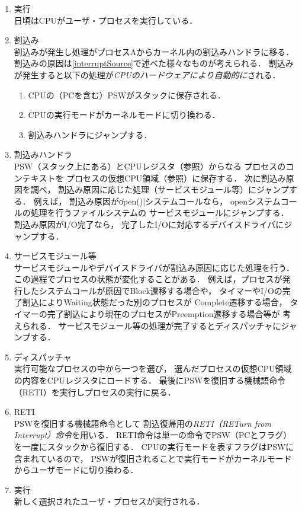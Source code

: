 \begin{enumerate}
\item 実行 \\
  日頃はCPUがユーザ・プロセスを実行している．
\item 割込み \\
  割込みが発生し処理がプロセスAからカーネル内の割込みハンドラに移る．
  割込みの原因は\ref{interruptSource}で述べた様々なものが考えられる．
  割込みが発生すると以下の処理が\emph{CPUのハードウェアにより自動的に}される．
  \begin{enumerate}
  \item CPUの（PCを含む）PSWがスタックに保存される．
  \item CPUの実行モードがカーネルモードに切り換わる．
  \item 割込みハンドラにジャンプする．
  \end{enumerate}
\item 割込みハンドラ \\
  PSW（スタック上にある）とCPUレジスタ（参照）からなる
  プロセスのコンテキストを
  プロセスの仮想CPU領域（参照）に保存する．
  次に割込み原因を調べ，
  割込み原因に応じた処理（サービスモジュール等）にジャンプする．
  例えば，
  割込み原因が\|open()|システムコールなら，
  openシステムコールの処理を行うファイルシステムの
  サービスモジュールにジャンプする．
  割込み原因がI/O完了なら，
  完了したI/Oに対応するデバイスドライバにジャンプする．
\item サービスモジュール等 \\
  サービスモジュールやデバイスドライバが割込み原因に応じた処理を行う．
  この過程でプロセスの状態が変化することがある．
  例えば，プロセスが発行したシステムコールが原因でBlock遷移する場合や，
  タイマーやI/Oの完了割込によりWaiting状態だった別のプロセスが
  Complete遷移する場合，
  タイマーの完了割込により現在のプロセスがPreemption遷移する場合等が
  考えられる．
  サービスモジュール等の処理が完了するとディスパッチャにジャンプする．
\item ディスパッチャ \\
  実行可能なプロセスの中から一つを選び，
  選んだプロセスの仮想CPU領域の内容をCPUレジスタにロードする．
  最後にPSWを復旧する機械語命令（RETI）を実行しプロセスの実行に戻る．
\item RETI \\
  PSWを復旧する機械語命令として
  割込復帰用の\emph{RETI（RETurn from Interrupt）命令}を用いる．
  RETI命令は単一の命令でPSW（PCとフラグ）を一度にスタックから復旧する．
  CPUの実行モードを表すフラグはPSWに含まれているので，
  PSWが復旧されることで実行モードがカーネルモードからユーザモードに切り換わる．
\item 実行 \\
  新しく選択されたユーザ・プロセスが実行される．
\end{enumerate}

